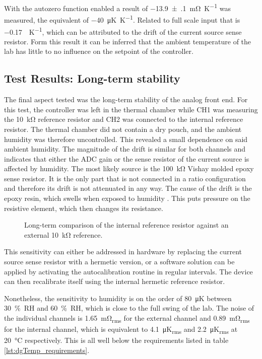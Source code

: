 With the autozero function enabled a result of \qty{-13.9(1)}{\milli\ohm\per\K} was measured, the equivalent of \qty{-40}{\micro\K \per \K}. Related to full scale input that is \qty{-0.17}{\ppm \per \K}, which can be attributed to the drift of the current source sense resistor. Form this result it can be inferred that the ambient temperature of the lab has little to no influence on the setpoint of the controller.

\subsection{Test Results: Long-term stability}
The final aspect tested was the long-term stability of the analog front end. For this test, the controller was left in the thermal chamber while CH1 was measuring the \qty{10}{\kilo \ohm}  reference resistor and CH2 was connected to the internal reference resistor. The thermal chamber did not contain a dry pouch, and the ambient humidity was therefore uncontrolled. This revealed a small dependence on said ambient humidity. The magnitude of the drift is similar for both channels and indicates that either the ADC gain or the sense resistor of the current source is affected by humidity. The most likely source is the \qty{100}{\kilo\ohm} Vishay  molded epoxy sense resistor. It is the only part that is not connected in a ratio configuration and therefore its drift is not attenuated in any way. The cause of the drift is the epoxy resin, which swells when exposed to humidity \cite{epoxy_humidity}. This puts pressure on the resistive element, which then changes its resistance.
\begin{figure}[htb]
    \centering
    \caption{Long-term comparison of the internal reference resistor against an external \qty{10}{\kilo\ohm} reference.}
    \label{fig:dgTemp_longterm}
\end{figure}

This sensitivity can either be addressed in hardware by replacing the current source sense resistor with a hermetic version, or a software solution can be applied by activating the autocalibration routine in regular intervals. The device can then recalibrate itself using the internal hermetic reference resistor.

Nonetheless, the sensitivity to humidity is on the order of \qty{80}{\micro \K} between \qty{30}{\percent RH} and \qty{60}{\percent RH}, which is close to the full swing of the lab. The noise of the individual channels is \qty{1.65}{\milli\ohm_{rms}} for the external channel and \qty{0.89}{\milli\ohm_{rms}} for the internal channel, which is equivalent to \qty{4.1}{\micro \K_{rms}} and \qty{2.2}{\micro \K_{rms}} at \qty{20}{\celsius} respectively. This is all well below the requirements listed in table \ref{lst:dgTemp_requirements}.

